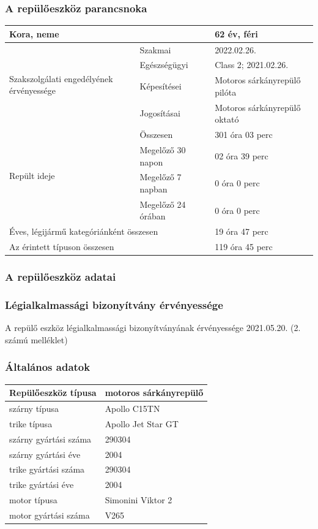 \documentclass[a4paper,10pt]{article}
\begin{document}
\subsubsection{A repülőeszköz parancsnoka}
\begin{tabular}{|l|l|l|}
\hline
 \multicolumn{2}{|l|}{Kora, neme} & 62 év, féri\\ \hline
 \multirow{4}{3cm}{Szakszolgálati engedélyének érvényessége}
    & Szakmai & 2022.02.26.\\ \cline{2-3}
    & Egészségügyi & Class 2; 2021.02.26.\\ \cline{2-3}
    & Képesítései & Motoros sárkányrepülő pilóta\\ \cline{2-3}
    & Jogosításai & Motoros sárkányrepülő oktató\\ \cline{2-3}
 \hline 
 \multirow{4}{3cm}{Repült ideje}
    & Összesen & 301 óra 03 perc\\ \cline{2-3}
    & Megelőző 30 napon & 02 óra 39 perc\\ \cline{2-3}
    & Megelőző 7 napban & 0 óra 0 perc\\ \cline{2-3}
    & Megelőző 24 órában & 0 óra 0 perc\\ \cline{2-3}
 \hline
 \multicolumn{2}{|l|}{Éves, légijármű kategóriánként összesen} & 19 óra 47 
perc\\ \hline
 \multicolumn{2}{|l|}{Az érintett típuson összesen} & 119 óra 45 perc\\ \hline
\end{tabular}

\subsubsection{A repülőeszköz adatai}
\subsubsection{Légialkalmassági bizonyítvány érvényessége}
A repülő eszköz légialkalmassági bizonyítványának érvényessége 2021.05.20. (2. 
számú melléklet)

\subsubsection{Általános adatok}
\begin{tabular}{|l|l|}
 \hline
 Repülőeszköz típusa & motoros sárkányrepülő\\ \hline
 szárny típusa & Apollo C15TN\\ \hline
 trike típusa & Apollo Jet Star GT\\ \hline
 szárny gyártási száma & 290304\\ \hline
 szárny gyártási éve & 2004\\ \hline
 trike gyártási száma & 290304\\ \hline
 trike gyártási éve & 2004\\ \hline
 motor típusa & Simonini Viktor 2\\ \hline
 motor gyártási száma & V265\\ \hline
\end{tabular}
\end{document}
